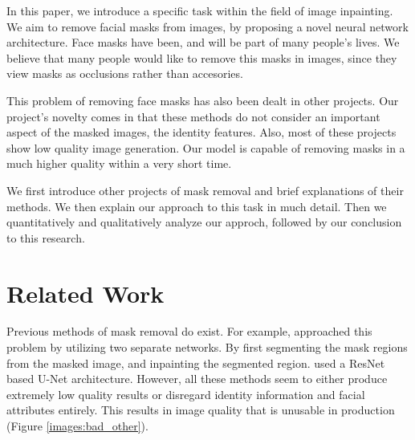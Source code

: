 \documentclass[sigconf,authorversion,nonacm]{acmart}
\begin{document}
In this paper, we introduce a specific task within the field of image inpainting.
We aim to remove facial masks from images, by proposing a novel neural network architecture.
Face masks have been, and will be part of many people's lives.
We believe that many people would like to remove this masks in images, since they view masks as occlusions rather than accesories.

This problem of removing face masks has also been dealt in other projects. Our project's
novelty comes in that these methods do not consider an important
aspect of the masked images, the identity features. Also, most of these projects show low quality image generation. Our model is capable of removing masks in a much higher quality within a very short time.

We first introduce other projects of mask removal and brief explanations of their methods. We then explain our approach to this task in much detail. Then we quantitatively and qualitatively analyze our approch, followed by our conclusion to this research.

\section{Related Work}
Previous methods of mask removal do exist. For example, \cite{GAN-Mask-Removal} approached
this problem by utilizing two separate networks. By first segmenting the mask regions from the
masked image, and inpainting the segmented region. \cite{STRV-ML} used a ResNet based U-Net architecture.
However, all these methods seem to either produce extremely low
quality results or disregard identity information and facial attributes entirely. This
results in image quality that is unusable in production (Figure \ref{images:bad_other}).
\end{document}
